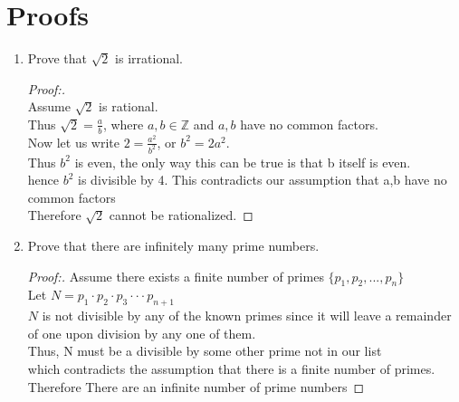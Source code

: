 \documentclass[11pt]{article}
\begin{document}
\section{Proofs}
\begin{enumerate}
    \item Prove that $\sqrt{2}$ is irrational.
        \begin{proof}[Proof:\nopunct] \\ 
             Assume $\sqrt{2}$ is rational. 
             \\ Thus $\sqrt{2} = \frac{a}{b}$, where $a,b \in \mathbb{Z}$ and $a,b$ have no common factors.
             \\ Now let us write $2 = \frac{a^2}{b^2}$, or $b^2=2a^2$.
             \\ Thus $b^2$ is even, the only way this can be true is that b itself is even.
             \\ hence $b^2$ is divisible by 4. This contradicts our assumption that a,b have no common factors
             \\ Therefore $\sqrt{2}$ cannot be rationalized.
        \end{proof}
        
    \item Prove that there are infinitely many prime numbers.
        \begin{proof}[Proof:\nopunct]
            Assume there exists a finite number of primes $\{p_1, p_2, ... , p_n \}$ 
            \\ Let $N = p_1\cdot p_2 \cdot p_3 \cdot \cdot \cdot p_{n+1}$
            \\ $N$ is not divisible by any of the known primes since it will leave a remainder of one upon division by any one of them.
            \\ Thus, N must be a divisible by some other prime not in our list
            \\ which contradicts the assumption that there is a finite number of primes.
            \\ Therefore There are an infinite number of prime numbers
        \end{proof}
        

\end{enumerate}
\end{document}
